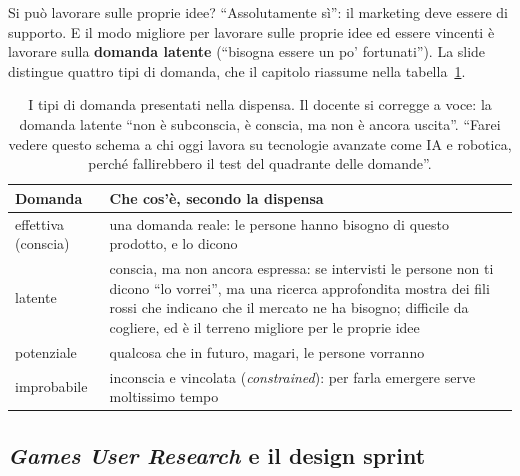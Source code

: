 Si può lavorare sulle proprie idee? ``Assolutamente sì'': il marketing deve essere di
supporto. E il modo migliore per lavorare sulle proprie idee ed essere vincenti è lavorare
sulla \textbf{domanda latente} (``bisogna essere un po' fortunati''). La slide distingue
quattro tipi di domanda, che il capitolo riassume nella tabella~\ref{a5:tab:domanda}.

\begin{table}[htbp]
\centering
\small
\begin{tabular}{@{}p{2.8cm}p{10.2cm}@{}}
\toprule
\textbf{Domanda} & \textbf{Che cos'è, secondo la dispensa} \\
\midrule
effettiva (conscia) & una domanda reale: le persone hanno bisogno di questo prodotto, e
lo dicono \\
latente & conscia, ma non ancora espressa: se intervisti le persone non ti dicono ``lo
vorrei'', ma una ricerca approfondita mostra dei fili rossi che indicano che il mercato ne
ha bisogno; difficile da cogliere, ed è il terreno migliore per le proprie idee \\
potenziale & qualcosa che in futuro, magari, le persone vorranno \\
improbabile & inconscia e vincolata (\emph{constrained}): per farla emergere serve
moltissimo tempo \\
\bottomrule
\end{tabular}
\caption{I tipi di domanda presentati nella dispensa. Il docente si corregge a voce: la
domanda latente ``non è subconscia, è conscia, ma non è ancora uscita''. ``Farei vedere
questo schema a chi oggi lavora su tecnologie avanzate come IA e robotica, perché
fallirebbero il test del quadrante delle domande''.}
\label{a5:tab:domanda}
\end{table}

\subsection{\emph{Games User Research} e il design sprint}



